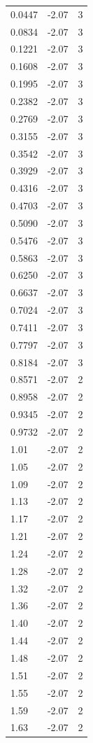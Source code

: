 \begin{longtable}{lrr}
  0.0447 & -2.07 & 3 \\
  0.0834 & -2.07 & 3 \\
  0.1221 & -2.07 & 3 \\
  0.1608 & -2.07 & 3 \\
  0.1995 & -2.07 & 3 \\
  0.2382 & -2.07 & 3 \\
  0.2769 & -2.07 & 3 \\
  0.3155 & -2.07 & 3 \\
  0.3542 & -2.07 & 3 \\
  0.3929 & -2.07 & 3 \\
  0.4316 & -2.07 & 3 \\
  0.4703 & -2.07 & 3 \\
  0.5090 & -2.07 & 3 \\
  0.5476 & -2.07 & 3 \\
  0.5863 & -2.07 & 3 \\
  0.6250 & -2.07 & 3 \\
  0.6637 & -2.07 & 3 \\
  0.7024 & -2.07 & 3 \\
  0.7411 & -2.07 & 3 \\
  0.7797 & -2.07 & 3 \\
  0.8184 & -2.07 & 3 \\
  0.8571 & -2.07 & 2 \\
  0.8958 & -2.07 & 2 \\
  0.9345 & -2.07 & 2 \\
  0.9732 & -2.07 & 2 \\
  1.01 & -2.07 & 2 \\
  1.05 & -2.07 & 2 \\
  1.09 & -2.07 & 2 \\
  1.13 & -2.07 & 2 \\
  1.17 & -2.07 & 2 \\
  1.21 & -2.07 & 2 \\
  1.24 & -2.07 & 2 \\
  1.28 & -2.07 & 2 \\
  1.32 & -2.07 & 2 \\
  1.36 & -2.07 & 2 \\
  1.40 & -2.07 & 2 \\
  1.44 & -2.07 & 2 \\
  1.48 & -2.07 & 2 \\
  1.51 & -2.07 & 2 \\
  1.55 & -2.07 & 2 \\
  1.59 & -2.07 & 2 \\
  1.63 & -2.07 & 2 \\

\end{longtable}

